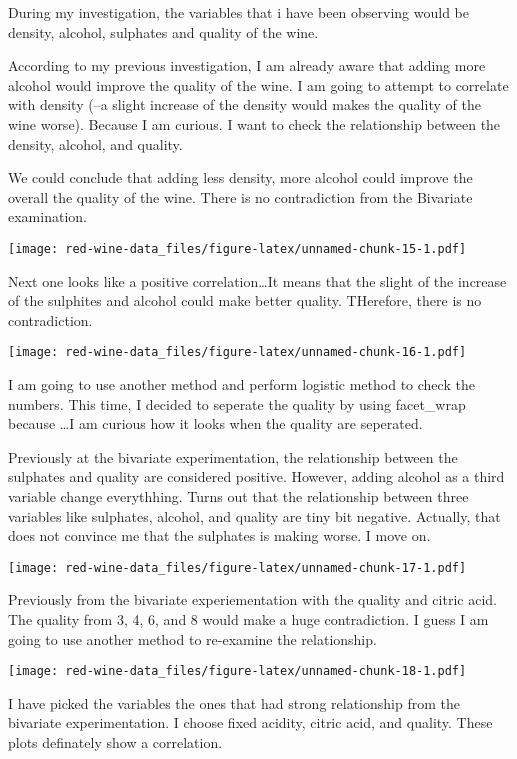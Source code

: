 \documentclass[]{article}
\begin{document}
During my investigation, the variables that i have been observing would
be density, alcohol, sulphates and quality of the wine.

According to my previous investigation, I am already aware that adding
more alcohol would improve the quality of the wine. I am going to
attempt to correlate with density (--a slight increase of the density
would makes the quality of the wine worse). Because I am curious. I want
to check the relationship between the density, alcohol, and quality.

We could conclude that adding less density, more alcohol could improve
the overall the quality of the wine. There is no contradiction from the
Bivariate examination.

\texttt{[image: red-wine-data\_files/figure-latex/unnamed-chunk-15-1.pdf]}

Next one looks like a positive correlation\ldots{}It means that the
slight of the increase of the sulphites and alcohol could make better
quality. THerefore, there is no contradiction.

\texttt{[image: red-wine-data\_files/figure-latex/unnamed-chunk-16-1.pdf]}

I am going to use another method and perform logistic method to check
the numbers. This time, I decided to seperate the quality by using
facet\_wrap because \ldots{}I am curious how it looks when the quality
are seperated.

Previously at the bivariate experimentation, the relationship between
the sulphates and quality are considered positive. However, adding
alcohol as a third variable change everythhing. Turns out that the
relationship between three variables like sulphates, alcohol, and
quality are tiny bit negative. Actually, that does not convince me that
the sulphates is making worse. I move on.

\texttt{[image: red-wine-data\_files/figure-latex/unnamed-chunk-17-1.pdf]}

Previously from the bivariate experiementation with the quality and
citric acid. The quality from 3, 4, 6, and 8 would make a huge
contradiction. I guess I am going to use another method to re-examine
the relationship.

\texttt{[image: red-wine-data\_files/figure-latex/unnamed-chunk-18-1.pdf]}

I have picked the variables the ones that had strong relationship from
the bivariate experimentation. I choose fixed acidity, citric acid, and
quality. These plots definately show a correlation.
\end{document}
